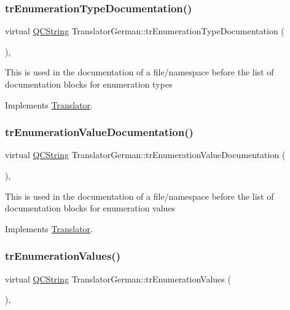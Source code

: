 \subsubsection{\texorpdfstring{trEnumerationTypeDocumentation()}{trEnumerationTypeDocumentation()}}
{\footnotesize\ttfamily virtual \mbox{\hyperlink{class_q_c_string}{Q\+C\+String}} Translator\+German\+::tr\+Enumeration\+Type\+Documentation (\begin{DoxyParamCaption}{ }\end{DoxyParamCaption})\hspace{0.3cm}{\ttfamily [inline]}, {\ttfamily [virtual]}}

This is used in the documentation of a file/namespace before the list of documentation blocks for enumeration types 

Implements \mbox{\hyperlink{class_translator}{Translator}}.

\mbox{\label{class_translator_german_a085a9273d752197639c39b41f97c3447}} 
\subsubsection{\texorpdfstring{trEnumerationValueDocumentation()}{trEnumerationValueDocumentation()}}
{\footnotesize\ttfamily virtual \mbox{\hyperlink{class_q_c_string}{Q\+C\+String}} Translator\+German\+::tr\+Enumeration\+Value\+Documentation (\begin{DoxyParamCaption}{ }\end{DoxyParamCaption})\hspace{0.3cm}{\ttfamily [inline]}, {\ttfamily [virtual]}}

This is used in the documentation of a file/namespace before the list of documentation blocks for enumeration values 

Implements \mbox{\hyperlink{class_translator}{Translator}}.

\mbox{\label{class_translator_german_a7d3bb173c20a4e583958da4050d4edfc}} 
\subsubsection{\texorpdfstring{trEnumerationValues()}{trEnumerationValues()}}
{\footnotesize\ttfamily virtual \mbox{\hyperlink{class_q_c_string}{Q\+C\+String}} Translator\+German\+::tr\+Enumeration\+Values (\begin{DoxyParamCaption}{ }\end{DoxyParamCaption})\hspace{0.3cm}{\ttfamily [inline]}, {\ttfamily [virtual]}}


